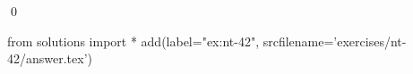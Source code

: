 
\begin{ex} 
  \label{ex:nt-42}
  
  \qed
\end{ex} 
\begin{python0}
from solutions import *
add(label="ex:nt-42",
    srcfilename='exercises/nt-42/answer.tex') 
\end{python0}
